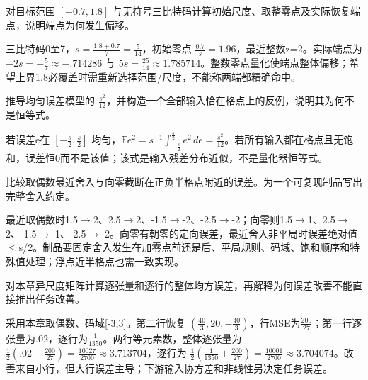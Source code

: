 
\begin{exercises}
\begin{exercise} 对目标范围 $[-0.7,1.8]$ 与无符号三比特码计算初始尺度、取整零点及实际恢复端点，说明端点为何发生偏移。

\begin{solution}
三比特码0至7，$s=\frac{1.8+0.7}{7}=\frac{5}{14}$，初始零点 $\frac{0.7}{s}=1.96$，最近整数z=2。实际端点为 $-2s=-\frac{5}{7}\approx-.714286$ 与 $5s=\frac{25}{14}\approx1.785714$。整数零点量化使端点整体偏移；希望上界1.8必覆盖时需重新选择范围/尺度，不能称两端都精确命中。
\end{solution}
\end{exercise}

\begin{exercise} 推导均匀误差模型的 $\frac{s^2}{12}$，并构造一个全部输入恰在格点上的反例，说明其为何不是恒等式。

\begin{solution}
若误差e在 $[-\frac{s}{2},\frac{s}{2}]$ 均匀，$\mathbb Ee^2=s^{-1}\int_{-\frac{s}{2}}^{\frac{s}{2}}e^2\,de=\frac{s^2}{12}$。若所有输入都在格点且无饱和，误差恒0而不是该值；该式是输入残差分布近似，不是量化器恒等式。
\end{solution}
\end{exercise}

\begin{exercise} 比较取偶数最近舍入与向零截断在正负半格点附近的误差。为一个可复现制品写出完整舍入约定。

\begin{solution}
最近取偶数时1.5$\to$2、2.5$\to$2、-1.5$\to$-2、-2.5$\to$-2；向零则1.5$\to$1、2.5$\to$2、-1.5$\to$-1、-2.5$\to$-2。向零有朝零的定向误差，最近舍入非平局时误差绝对值$\le$s/2。制品要固定舍入发生在加零点前还是后、平局规则、码域、饱和顺序和特殊值处理；浮点近半格点也需一致实现。
\end{solution}
\end{exercise}

\begin{exercise} 对本章异尺度矩阵计算逐张量和逐行的整体均方误差，再解释为何误差改善不能直接推出任务改善。

\begin{solution}
采用本章取偶数、码域[-3,3]。第二行恢复 $(\frac{40}{3},20,-\frac{40}{3})$，行MSE为$\frac{200}{27}$；第一行逐张量为.02，逐行为$\frac{1}{1350}$。两行等元素数，整体逐张量为 $\frac12(.02+\frac{200}{27})=\frac{10027}{2700}\approx3.713704$，逐行为 $\frac12(\frac{1}{1350}+\frac{200}{27})=\frac{10001}{2700}\approx3.704074$。改善来自小行，但大行误差主导；下游输入协方差和非线性另决定任务误差。
\end{solution}
\end{exercise}


\end{exercises}

